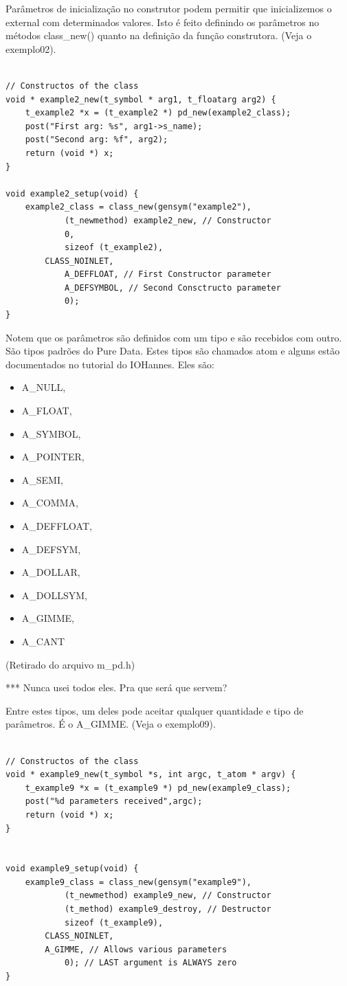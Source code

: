\documentclass[10pt,a4paper]{report}
\begin{document}
Parâmetros de inicialização no construtor podem permitir que inicializemos o external com determinados valores. Isto é feito definindo os parâmetros no métodos class\_new() quanto na definição da função construtora. (Veja o exemplo02).

\begin{lstlisting}

// Constructos of the class
void * example2_new(t_symbol * arg1, t_floatarg arg2) {
    t_example2 *x = (t_example2 *) pd_new(example2_class);
    post("First arg: %s", arg1->s_name);
    post("Second arg: %f", arg2);
    return (void *) x;
}

void example2_setup(void) {
    example2_class = class_new(gensym("example2"),
            (t_newmethod) example2_new, // Constructor
            0,
            sizeof (t_example2),
	    CLASS_NOINLET,
            A_DEFFLOAT, // First Constructor parameter
            A_DEFSYMBOL, // Second Consctructo parameter
            0);
}
\end{lstlisting}

Notem que os parâmetros são definidos com um tipo e são recebidos com outro. São tipos padrões do Pure Data. Estes tipos são chamados atom e alguns estão documentados no tutorial do IOHannes. Eles são:
\begin{itemize}
\item A\_NULL,
\item A\_FLOAT,
\item A\_SYMBOL,
\item A\_POINTER,
\item A\_SEMI,
\item A\_COMMA,
\item A\_DEFFLOAT,
\item A\_DEFSYM,
\item A\_DOLLAR, 
\item A\_DOLLSYM,
\item A\_GIMME,
\item A\_CANT
\end{itemize}
(Retirado do arquivo m\_pd.h)

*** Nunca usei todos eles. Pra que será que servem?

Entre estes tipos, um deles pode aceitar qualquer quantidade e tipo de parâmetros. É o A\_GIMME. (Veja o exemplo09). 

\begin{lstlisting}

// Constructos of the class
void * example9_new(t_symbol *s, int argc, t_atom * argv) {
    t_example9 *x = (t_example9 *) pd_new(example9_class);
    post("%d parameters received",argc);
    return (void *) x;
}


void example9_setup(void) {
    example9_class = class_new(gensym("example9"),
            (t_newmethod) example9_new, // Constructor
            (t_method) example9_destroy, // Destructor
            sizeof (t_example9),
	    CLASS_NOINLET,
	    A_GIMME, // Allows various parameters
            0); // LAST argument is ALWAYS zero
}
\end{lstlisting}
\end{document}
